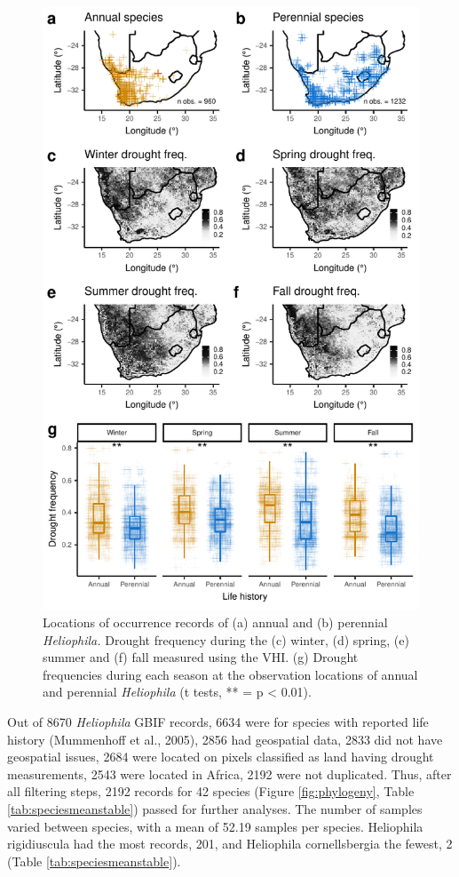 \documentclass[man,floatsintext]{apa6}
\theoremstyle{definition}
\theoremstyle{definition}
\theoremstyle{definition}
\theoremstyle{remark}
\begin{document}
\begin{figure}[!h]
\includegraphics[width=\textwidth]{../figures/maps_boxplots} \caption{Locations of occurrence records of (a) annual and (b)
perennial \emph{Heliophila.} Drought frequency during the (c) winter,
(d) spring, (e) summer and (f) fall measured using the VHI. (g) Drought
frequencies during each season at the observation locations of annual
and perennial \emph{Heliophila} (t tests, ** = p \textless{} 0.01).}\label{fig:mapsboxplots}
\end{figure}

Out of 8670 \emph{Heliophila} GBIF records, 6634 were for species with
reported life history (Mummenhoff et al., 2005), 2856 had geospatial
data, 2833 did not have geospatial issues, 2684 were located on pixels
classified as land having drought measurements, 2543 were located in
Africa, 2192 were not duplicated. Thus, after all filtering steps, 2192
records for 42 species (Figure \ref{fig:phylogeny}, Table
\ref{tab:speciesmeanstable}) passed for further analyses. The number of
samples varied between species, with a mean of 52.19 samples per
species. Heliophila rigidiuscula had the most records, 201, and
Heliophila cornellsbergia the fewest, 2 (Table
\ref{tab:speciesmeanstable}).
\end{document}
